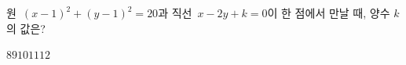 원~$(x-1)^2+(y-1)^2=20$과 직선~$x-2y+k=0$이 한 점에서 만날 때, 양수 $k$의 값은?
\begin{choices32}{$8$}{$9$}{$10$}{$11$}{$12$}\end{choices32}
